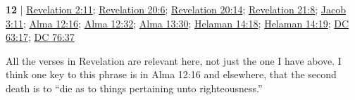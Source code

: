 \begin{compactdesc}
		\item[second death] \textbf{12} | \hyperref[REVELATIONNT-2-11]{Revelation 2:11}; \hyperref[REVELATIONNT-20-6]{Revelation 20:6}; \hyperref[REVELATIONNT-20-14]{Revelation 20:14}; \hyperref[REVELATIONNT-21-8]{Revelation 21:8}; \hyperref[JACOB-3-11]{Jacob 3:11}; \hyperref[ALMA-12-16]{Alma 12:16}; \hyperref[ALMA-12-32]{Alma 12:32}; \hyperref[ALMA-13-30]{Alma 13:30}; \hyperref[HELAMAN-14-18]{Helaman 14:18}; \hyperref[HELAMAN-14-19]{Helaman 14:19}; \hyperref[DC63-17]{DC 63:17}; \hyperref[DC76-37]{DC 76:37}
			\begin{compactdesc}
				\item[Bible anchor verses] \phantom{.}
					\begin{compactdesc}
						\item[{\hyperref[REVELATIONNT-21-8]{Revelation 21:8}}] 
					\end{compactdesc}
				\item[Commentary] All the verses in Revelation are relevant here, not just the one I have above. I think one key to this phrase is in Alma 12:16 and elsewhere, that the second death is to ``die as to things pertaining unto righteousness.'' 
			\end{compactdesc}
			
	\end{compactdesc}
	


	
		
